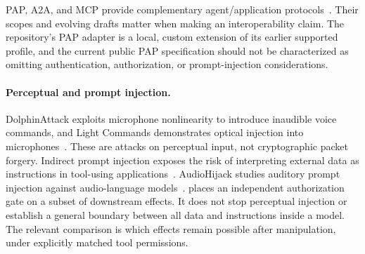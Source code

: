 PAP, A2A, and MCP provide complementary agent/application
protocols~\cite{pap03,a2a,mcp}. Their scopes and evolving drafts matter when
making an interoperability claim. The repository's PAP adapter is a local,
custom extension of its earlier supported profile, and the current public
PAP specification should not be characterized as omitting authentication,
authorization, or prompt-injection considerations.

\paragraph{Perceptual and prompt injection.}
DolphinAttack exploits microphone nonlinearity to introduce inaudible voice
commands, and Light Commands demonstrates optical injection into
microphones~\cite{dolphin,lightcommands}. These are attacks on perceptual input,
not cryptographic packet forgery. Indirect prompt injection exposes the risk
of interpreting external data as instructions in tool-using
applications~\cite{greshake}. AudioHijack studies auditory prompt injection
against audio-language models~\cite{audiohijack}. \sys{} places an independent
authorization gate on a subset of downstream effects. It does not stop
perceptual injection or establish a general boundary between all data and
instructions inside a model. The relevant comparison is which effects remain
possible after manipulation, under explicitly matched tool permissions.
